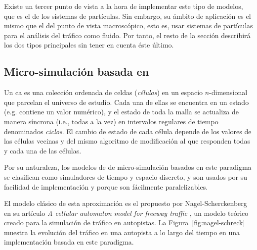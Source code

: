 Existe un tercer punto de vista a la hora de implementar este tipo de modelos, que es el de los sistemas de partículas. Sin embargo, su ámbito de aplicación es el mismo que el del punto de vista macroscópico, esto es, usar sistemas de partículas para el análisis del tráfico como fluido. Por tanto, el resto de la sección describirá los dos tipos principales sin tener en cuenta éste último.

\subsection{Micro-simulación basada en }

Un \Acrfull{ca} es una colección ordenada de celdas (\textit{células}) en un espacio $n$-dimensional que parcelan el universo de estudio. Cada una de ellas se encuentra en un estado (e.g. contiene un valor numérico), y el estado de toda la malla se actualiza de manera síncrona (i.e., todas a la vez) en intervalos regulares de tiempo denominados \textit{ciclos}. El cambio de estado de cada célula depende de los valores de las células vecinas y del mismo algoritmo de modificación al que responden todas y cada una de las células.

Por su naturaleza, los modelos de de micro-simulación basados en este paradigma se clasifican como simuladores de tiempo y espacio discreto, y son usados por su facilidad de implementación y porque son fácilmente paralelizables.

El modelo clásico de esta aproximación es el propuesto por Nagel-Scherckenberg en su artículo \textit{A cellular automaton model for freeway traffic} \cite{Nagel1992}, un modelo teórico creado para la simulación de tráfico en autopistas. La Figura~\ref{fig:nagel-schreck} muestra la evolución del tráfico en una autopista a lo largo del tiempo en una implementación basada en este paradigma.

